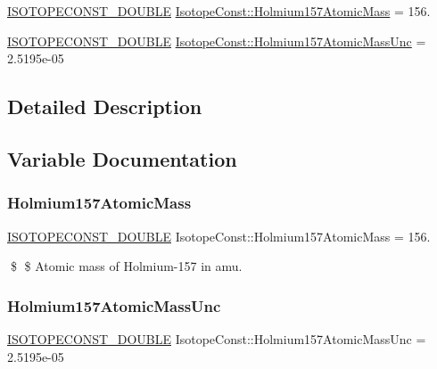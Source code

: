 \begin{DoxyCompactItemize}
\item 
\mbox{\hyperlink{group___isotope_const-_macros_ga8f45a7272ce02c0b4c65c44636ed719a}{I\+S\+O\+T\+O\+P\+E\+C\+O\+N\+S\+T\+\_\+\+D\+O\+U\+B\+LE}} \mbox{\hyperlink{group___isotope_const-_holmium-_ho157_ga94e53ebb79e571153fd1252ae0c11243}{Isotope\+Const\+::\+Holmium157\+Atomic\+Mass}} = 156.
\item 
\mbox{\hyperlink{group___isotope_const-_macros_ga8f45a7272ce02c0b4c65c44636ed719a}{I\+S\+O\+T\+O\+P\+E\+C\+O\+N\+S\+T\+\_\+\+D\+O\+U\+B\+LE}} \mbox{\hyperlink{group___isotope_const-_holmium-_ho157_ga4c046ba1c1550683e3ad9b32ad486ff1}{Isotope\+Const\+::\+Holmium157\+Atomic\+Mass\+Unc}} = 2.\+5195e-\/05
\end{DoxyCompactItemize}


\subsection{Detailed Description}


\subsection{Variable Documentation}
\mbox{\label{group___isotope_const-_holmium-_ho157_ga94e53ebb79e571153fd1252ae0c11243}} 
\subsubsection{\texorpdfstring{Holmium157\+Atomic\+Mass}{Holmium157AtomicMass}}
{\footnotesize\ttfamily \mbox{\hyperlink{group___isotope_const-_macros_ga8f45a7272ce02c0b4c65c44636ed719a}{I\+S\+O\+T\+O\+P\+E\+C\+O\+N\+S\+T\+\_\+\+D\+O\+U\+B\+LE}} Isotope\+Const\+::\+Holmium157\+Atomic\+Mass = 156.}

\$ \$ Atomic mass of Holmium-\/157 in amu. \mbox{\label{group___isotope_const-_holmium-_ho157_ga4c046ba1c1550683e3ad9b32ad486ff1}} 
\subsubsection{\texorpdfstring{Holmium157\+Atomic\+Mass\+Unc}{Holmium157AtomicMassUnc}}
{\footnotesize\ttfamily \mbox{\hyperlink{group___isotope_const-_macros_ga8f45a7272ce02c0b4c65c44636ed719a}{I\+S\+O\+T\+O\+P\+E\+C\+O\+N\+S\+T\+\_\+\+D\+O\+U\+B\+LE}} Isotope\+Const\+::\+Holmium157\+Atomic\+Mass\+Unc = 2.\+5195e-\/05}

